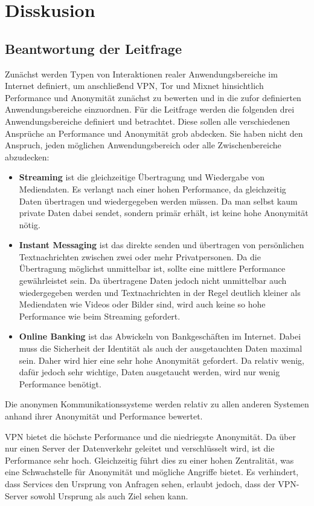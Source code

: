 \section{Disskusion}

\subsection{Beantwortung der Leitfrage}

Zunächst werden Typen von Interaktionen realer Anwendungsbereiche im Internet definiert, um anschließend VPN, Tor und Mixnet hinsichtlich Performance und Anonymität zunächst zu bewerten und in die zufor definierten Anwendungsbereiche einzuordnen.
Für die Leitfrage werden die folgenden drei Anwendungsbereiche definiert und betrachtet. Diese sollen alle verschiedenen Ansprüche an Performance und Anonymität grob abdecken. Sie haben nicht den Anspruch, jeden möglichen Anwendungsbereich oder alle Zwischenbereiche abzudecken:

\begin{itemize}
    \item \textbf{Streaming} ist die gleichzeitige Übertragung und Wiedergabe von Mediendaten. Es verlangt nach einer hohen Performance, da gleichzeitig Daten übertragen und wiedergegeben werden müssen. Da man selbst kaum private Daten dabei sendet, sondern primär erhält, ist keine hohe Anonymität nötig.
    \item \textbf{Instant Messaging} ist das direkte senden und übertragen von persönlichen Textnachrichten zwischen zwei oder mehr Privatpersonen. Da die Übertragung möglichst unmittelbar ist, sollte eine mittlere Performance gewährleistet sein. Da übertragene Daten jedoch nicht unmittelbar auch wiedergegeben werden und Textnachrichten in der Regel deutlich kleiner als Mediendaten wie Videos oder Bilder sind, wird auch keine so hohe Performance wie beim Streaming gefordert.
    \item \textbf{Online Banking} ist das Abwickeln von Bankgeschäften im Internet. Dabei muss die Sicherheit der Identität als auch der ausgetauchten Daten maximal sein. Daher wird hier eine sehr hohe Anonymität gefordert. Da relativ wenig, dafür jedoch sehr wichtige, Daten ausgetaucht werden, wird nur wenig Performance benötigt.
\end{itemize}

Die anonymen Kommunikationssysteme werden relativ zu allen anderen Systemen anhand ihrer Anonymität und Performance bewertet.

VPN bietet die höchste Performance und die niedriegste Anonymität. Da über nur einen Server der Datenverkehr geleitet und verschlüsselt wird, ist die Performance sehr hoch. Gleichzeitig führt dies zu einer hohen Zentralität, was eine Schwachstelle für Anonymität und mögliche Angriffe bietet. Es verhindert, dass Services den Ursprung von Anfragen sehen, erlaubt jedoch, dass der VPN-Server sowohl Ursprung als auch Ziel sehen kann.

